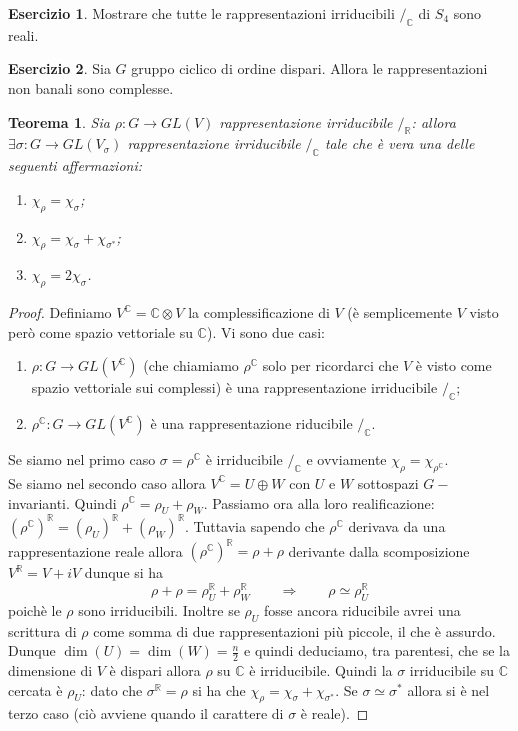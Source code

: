 \documentclass[11pt]{article}
\theoremstyle{plain}
\newtheorem{thm}{Teorema}[section]
\theoremstyle{definition}
\newtheorem{exercise}{Esercizio}[section]
\theoremstyle{remark}
\newcommand{\C}{\mathbb{C}}
\newcommand{\R}{\mathbb{R}}
\DeclareMathOperator{\iso}{\simeq}
\begin{document}
\begin{exercise}
	Mostrare che tutte le rappresentazioni irriducibili $/_\C$ di $S_4$ sono reali.
\end{exercise}
\begin{exercise}
	Sia $G$ gruppo ciclico di ordine dispari. Allora le rappresentazioni non banali sono complesse.
\end{exercise}




\begin{thm}
Sia $\rho:G\rightarrow GL(V)$ rappresentazione irriducibile $/_\R$: allora $\exists \sigma:G\rightarrow GL(V_{\sigma})$ rappresentazione irriducibile $/_\C$ tale che è vera una delle seguenti affermazioni:
\begin{enumerate}
\item $\chi_\rho=\chi_\sigma$;
\item $\chi_\rho=\chi_\sigma+\chi_{\sigma^*}$;
\item $\chi_\rho= 2\chi_\sigma$.
\end{enumerate}
\end{thm}

\begin{proof} Definiamo $V^\C=\C\otimes V$ la complessificazione di $V$ (è semplicemente $V$ visto però come spazio vettoriale su $\C$). Vi sono due casi:
\begin{enumerate}
\item $\rho:G\rightarrow GL(V^\C)$ (che chiamiamo $\rho^\C$ solo per ricordarci che $V$ è visto come spazio vettoriale sui complessi) è una rappresentazione irriducibile $/_\C$;
\item $\rho^\C:G\rightarrow GL(V^\C)$ è una rappresentazione riducibile $/_\C$.
\end{enumerate}
Se siamo nel primo caso $\sigma=\rho^\C$ è irriducibile $/_\C$ e ovviamente $\chi_\rho=\chi_{\rho^\C}$.\\
Se siamo nel secondo caso allora $V^\C=U\oplus W$ con $U$ e $W$ sottospazi $G-$invarianti. Quindi $\rho^\C=\rho_U+\rho_W$. Passiamo ora alla loro realificazione: $(\rho^\C)^\R=(\rho_U)^\R+(\rho_W)^\R$. Tuttavia sapendo che $\rho^\C$ derivava da una rappresentazione reale allora $(\rho^\C)^\R=\rho+\rho$ derivante dalla scomposizione $V^\R=V+iV$ dunque si ha
\[\rho+\rho=\rho_U^\R+\rho_W^\R\qquad\Longrightarrow\qquad \rho\iso\rho_U^\R\]
poichè le $\rho$ sono irriducibili. Inoltre se $\rho_U$ fosse ancora riducibile avrei una scrittura di $\rho$ come somma di due rappresentazioni più piccole, il che è assurdo. Dunque $\dim(U)=\dim(W)=\frac{n}{2}$ e quindi deduciamo, tra parentesi, che se la dimensione di $V$ è dispari allora $\rho$ su $\C$ è irriducibile.
Quindi la $\sigma$ irriducibile su $\C$ cercata è $\rho_U$:
dato che $\sigma^\R=\rho$ si ha che $\chi_\rho=\chi_\sigma+\chi_{\sigma^*}$. Se $\sigma\iso \sigma^*$ allora si è nel terzo caso (ciò avviene quando il carattere di $\sigma$ è reale).
\end{proof}
\end{document}
